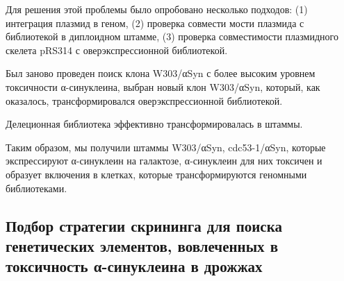 
Для решения этой проблемы было опробовано несколько подходов: (1) интеграция плазмид в геном, (2) проверка совмести мости плазмида с библиотекой в диплоидном штамме, (3) проверка совместимости плазмидного скелета pRS314 с оверэкспрессионной библиотекой.




Был заново проведен поиск клона W303/αSyn с более высоким уровнем токсичности α-синуклеина, выбран новый клон W303/αSyn, который, как оказалось, трансформировался оверэкспрессионной библиотекой.

Делеционная библиотека эффективно трансформировалась в штаммы.

Таким образом, мы получили штаммы W303/αSyn, cdc53-1/αSyn, которые экспрессируют α-синуклеин на галактозе, α-синуклеин для них токсичен и образует включения в клетках, которые трансформируются геномными библиотеками.




\subsection{Подбор стратегии скрининга для поиска генетических элементов, вовлеченных в токсичность α-синуклеина в дрожжах}

